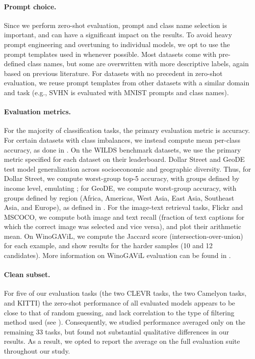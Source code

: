 \paragraph{Prompt choice.} Since we perform zero-shot evaluation, prompt and class name selection is important, and can have a significant impact on the results. To avoid heavy prompt engineering and overtuning to individual models, we opt to use the prompt templates used in \citet{radford2021learning} whenever possible. Most datasets come with pre-defined class names, but some are overwritten with more descriptive labels, again based on previous literature. For datasets with no precedent in zero-shot evaluation, we reuse prompt templates from other datasets with a similar domain and task (e.g., SVHN is evaluated with MNIST prompts and class names).

\paragraph{Evaluation metrics.} For the majority of classification tasks, the primary evaluation metric is accuracy. For certain datasets with class imbalances, we instead compute mean per-class accuracy, as done in \citet{radford2021learning}. On the WILDS benchmark datasets, we use the primary metric specified for each dataset on their leaderboard. Dollar Street and GeoDE test model generalization across socioeconomic and geographic diversity. Thus, for Dollar Street, we compute worst-group top-5 accuracy, with groups defined by income level, emulating \citet{rojas2022dollar}; for GeoDE, we compute worst-group accuracy, with groups defined by region (Africa, Americas, West Asia, East Asia, Southeast Asia, and Europe), as defined in \citet{ramaswamy2022geode}. For the image-text retrieval tasks, Flickr and MSCOCO, we compute both image and text recall (fraction of text captions for which the correct image was selected and vice versa), and plot their arithmetic mean. On WinoGAViL, we compute the Jaccard score (intersection-over-union) for each example, and show results for the harder samples (10 and 12 candidates). More information on WinoGAViL evaluation can be found in \citet{bitton2022winogavil}.

\paragraph{Clean subset.} For five of our evaluation tasks (the two CLEVR tasks, the two Camelyon tasks, and KITTI) the zero-shot performance of all evaluated models appears to be close to that of random guessing, and lack correlation to the type of filtering method used (see ). Consequently, we studied performance averaged only on the remaining 33 tasks, but found not substantial qualitative differences in our results.  As a result, we opted to report the average on the full evaluation suite throughout our study. 

